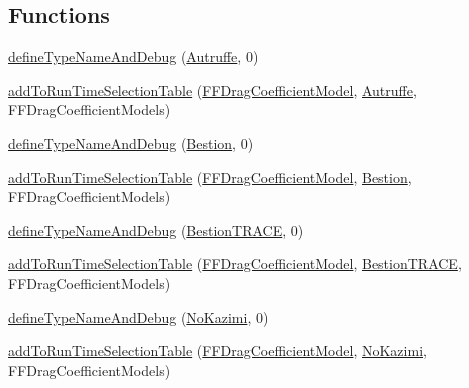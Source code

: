 \subsection*{Functions}
\begin{DoxyCompactItemize}
\item 
\hyperlink{namespaceFoam_1_1FFDragCoefficientModels_a030f2eadcf7c5de7923d223ef352b09f}{define\+Type\+Name\+And\+Debug} (\hyperlink{classFoam_1_1FFDragCoefficientModels_1_1Autruffe}{Autruffe}, 0)
\item 
\hyperlink{namespaceFoam_1_1FFDragCoefficientModels_a1a60834afb5716f81bb4203df77121ea}{add\+To\+Run\+Time\+Selection\+Table} (\hyperlink{classFoam_1_1FFDragCoefficientModel}{F\+F\+Drag\+Coefficient\+Model}, \hyperlink{classFoam_1_1FFDragCoefficientModels_1_1Autruffe}{Autruffe}, F\+F\+Drag\+Coefficient\+Models)
\item 
\hyperlink{namespaceFoam_1_1FFDragCoefficientModels_aff2bb359ac09e6affdc9243b035ef1a3}{define\+Type\+Name\+And\+Debug} (\hyperlink{classFoam_1_1FFDragCoefficientModels_1_1Bestion}{Bestion}, 0)
\item 
\hyperlink{namespaceFoam_1_1FFDragCoefficientModels_ae941df4376f464c3c1f6c3f35c1c2622}{add\+To\+Run\+Time\+Selection\+Table} (\hyperlink{classFoam_1_1FFDragCoefficientModel}{F\+F\+Drag\+Coefficient\+Model}, \hyperlink{classFoam_1_1FFDragCoefficientModels_1_1Bestion}{Bestion}, F\+F\+Drag\+Coefficient\+Models)
\item 
\hyperlink{namespaceFoam_1_1FFDragCoefficientModels_afb66b97d31c980070c7023ad772103b6}{define\+Type\+Name\+And\+Debug} (\hyperlink{classFoam_1_1FFDragCoefficientModels_1_1BestionTRACE}{Bestion\+T\+R\+A\+CE}, 0)
\item 
\hyperlink{namespaceFoam_1_1FFDragCoefficientModels_a3c289f9ecca4cabc40352200f09a9d77}{add\+To\+Run\+Time\+Selection\+Table} (\hyperlink{classFoam_1_1FFDragCoefficientModel}{F\+F\+Drag\+Coefficient\+Model}, \hyperlink{classFoam_1_1FFDragCoefficientModels_1_1BestionTRACE}{Bestion\+T\+R\+A\+CE}, F\+F\+Drag\+Coefficient\+Models)
\item 
\hyperlink{namespaceFoam_1_1FFDragCoefficientModels_a929f7762cda08ed6c929673e938758c0}{define\+Type\+Name\+And\+Debug} (\hyperlink{classFoam_1_1FFDragCoefficientModels_1_1NoKazimi}{No\+Kazimi}, 0)
\item 
\hyperlink{namespaceFoam_1_1FFDragCoefficientModels_adf342ac404f9f406256ec990f25d0e74}{add\+To\+Run\+Time\+Selection\+Table} (\hyperlink{classFoam_1_1FFDragCoefficientModel}{F\+F\+Drag\+Coefficient\+Model}, \hyperlink{classFoam_1_1FFDragCoefficientModels_1_1NoKazimi}{No\+Kazimi}, F\+F\+Drag\+Coefficient\+Models)

\end{DoxyCompactItemize}
